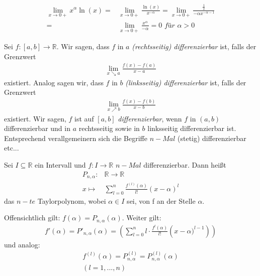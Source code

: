 
\begin{Beispiel}{
	\begin{align*}
		\lim\limits_{x \rightarrow 0+}{x^{\alpha} \ln(x)} = &
		\lim\limits_{x \rightarrow 0+}{\frac{\ln(x)}{x^{- \alpha}}}
		= \lim\limits_{x \rightarrow 0+}{\frac{\frac{1}{x}}{-\alpha x^{-\alpha-1}}}
		\\ = & \lim\limits_{x \rightarrow 0+}{\frac{x^{\alpha}}{-\alpha}}
		= 0 \textit{ für } \alpha > 0 
	\end{align*}
}\end{Beispiel}

\begin{Definition}{
	Sei $f: [a,b] \rightarrow \mathbb{R}$. Wir sagen, dass $f$ in $a$ 
	\textit{(rechtsseitig) differenzierbar} ist, falls der Grenzwert
	\begin{align*}
		\lim\limits_{x \searrow a}{\frac{f(x)-f(a)}{x-a}}
	\end{align*}
	existiert.
	Analog sagen wir, dass $f$ in $b$ \textit{(linksseitig) differenzierbar} ist, 
	falls der Grenzwert 
	\begin{align*}
		\lim\limits_{x \nearrow b}{\frac{f(x)-f(b)}{x-b}}
	\end{align*}
	existiert. Wir sagen, $f$ ist auf $[a,b]$ \textit{differenzierbar}, wenn $f$ in 
	$(a,b)$ differenzierbar und in $a$ rechtsseitig sowie in $b$ linksseitig 
	differenzierbar ist. Entsprechend verallgemeinern sich die Begriffe $n-Mal$
	(stetig) differenzierbar etc...
	
}\end{Definition}

\begin{Definition}{
	Sei $I \subseteq \mathbb{R}$ ein Intervall und $f : I \rightarrow \mathbb{R}$ 
	$n-Mal$ differenzierbar. Dann heißt 
	\begin{align*}
		P_{n, \alpha} : & \mathbb{R} \rightarrow \mathbb{R} \\
		x \mapsto & \sum_{l = 0}^n \frac{f^{(l)}(\alpha)}{l !} (x - \alpha)^l
	\end{align*}
	das $n-te$ Taylorpolynom, wobei $\alpha \in I$ sei, von f an der Stelle 
	$\alpha$.
}\end{Definition}

\begin{Bemerkung}{
	Offensichtlich gilt: 
	$f(\alpha) = P_{n, \alpha} ( \alpha)$. Weiter gilt: 
	\begin{align*}
		f'(\alpha) = P'_{n, \alpha}(\alpha) = \left( \sum_{l = 0}^n l 
		\cdot \frac{f^l (\alpha)}{l!} \left( x  - \alpha) ^{l-1} \right) \right)
	\end{align*}
	und analog: 
	\begin{align*}
		f^{(l)} (\alpha) = P_{n, \alpha}^{(l)} = P_{n, \alpha}^{(l)} (\alpha) \\
		( l = 1, ..., n)
	\end{align*}
}\end{Bemerkung}

